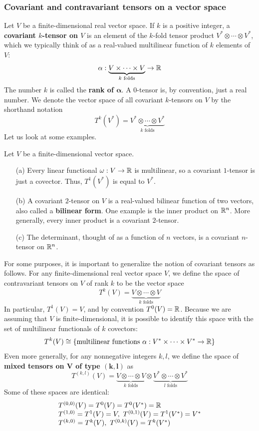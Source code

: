 \subsubsection{Covariant and contravariant tensors on a vector space}
Let $V$ be a finite-dimensional real vector space. If $k$ is a positive integer, a \textbf{covariant $k$-tensor on $V$} is an element of the $k$-fold tensor product $V^*\otimes\cdots\otimes V^*$, which we typically think of as a real-valued multilinear function of $k$ elements of $V$:
\[\alpha:\underbrace{V\times\cdots\times V}_{\text{$k$ folds}}\to\mathbb{R}\]
The number $k$ is called the \textbf{rank of $\bm{\alpha}$}. A $0$-tensor is, by convention, just a real number. We denote the vector space of all covariant $k$-tensors on $V$ by the shorthand notation
\[T^k(V^*)=\underbrace{V^*\otimes\cdots\otimes V^*}_{\text{$k$ folds}}\]
Let us look at some examples.
\begin{example}
Let $V$ be a finite-dimensional vector space.
\begin{itemize}
\item[(a)] Every linear functional $\omega:V\to\mathbb{R}$ is multilinear, so a covariant $1$-tensor is just a covector. Thus, $T^1(V^*)$ is equal to $V^*$.
\item[(b)] A covariant $2$-tensor on $V$ is a real-valued bilinear function of two vectors, also called a \textbf{bilinear form}. One example is the inner product on $\mathbb{R}^n$. More generally, every inner product is a covariant $2$-tensor.
\item[(c)] The determinant, thought of as a function of $n$ vectors, is a covariant $n$-tensor on $\mathbb{R}^n$.
\end{itemize}
\end{example}
For some purposes, it is important to generalize the notion of covariant tensors
as follows. For any finite-dimensional real vector space $V$, we define the space of contravariant tensors on $V$ of rank $k$ to be the vector space
\[T^k(V)=\underbrace{V\otimes\cdots\otimes V}_{\text{$k$ folds}}\]
In particular, $T^1(V)=V$, and by convention $T^0(V)=\mathbb{R}$. Because we are assuming
that $V$ is finite-dimensional, it is possible to identify this space with the set of multilinear functionals of $k$ covectors:
\[T^k(V)\cong\{\text{multilinear functions } \alpha:V^*\times\cdots\times V^*\to\mathbb{R}\}\]
Even more generally, for any nonnegative integers $k,l$, we define the space of
\textbf{mixed tensors on $\bm{V}$ of type $\bm{(k,l)}$} as
\[T^{(k,l)}(V)=\underbrace{V\otimes\cdots\otimes V}_{\text{$k$ folds}}\otimes \underbrace{V^*\otimes\cdots\otimes V^*}_{\text{$l$ folds}}\]
Some of these spaces are identical:
\[\begin{array}{l}
T^{(0,0)}(V)=T^0(V)=T^0(V^*)=\mathbb{R}\\
T^{(1,0)}=T^1(V)=V,\ T^{(0,1)}(V)=T^1(V^*)=V^*\\
T^{(k,0)}=T^k(V),\ T^{(0,k)}(V)=T^k(V^*)
\end{array}\]

